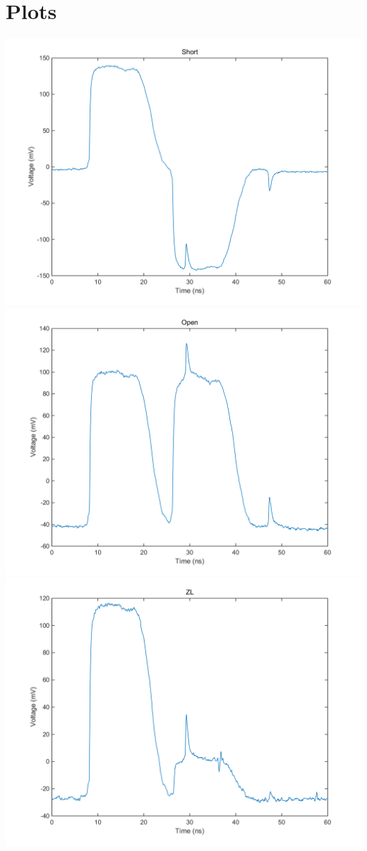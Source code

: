 \section{Plots} 

\includegraphics[width=\textwidth]{plots/short}
\includegraphics[width=\textwidth]{plots/open}
\includegraphics[width=\textwidth]{plots/ZL}

